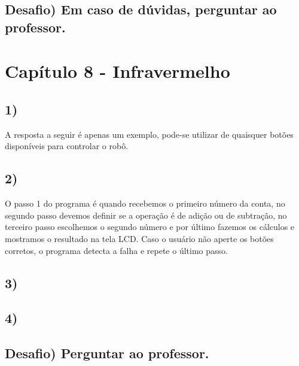     \subsection*{Desafio) Em caso de dúvidas, perguntar ao professor.}

\section*{Capítulo 8 - Infravermelho}

    \subsection*{1)}
    A resposta a seguir é apenas um exemplo, pode-se utilizar de quaisquer botões disponíveis para controlar o robô.
    
 

    
    \subsection*{2)}
    
 
 
    O passo 1 do programa é quando recebemos o primeiro número da conta, no segundo passo devemos definir se a operação é de adição ou de subtração, no terceiro passo escolhemos o segundo número e por último fazemos os cálculos e mostramos o resultado na tela LCD. Caso o usuário não aperte os botões corretos, o programa detecta a falha e repete o último passo.
    
    \subsection*{3)}
 
 

    
    \subsection*{4)}
    
 

    
    \subsection*{Desafio) Perguntar ao professor.}
    